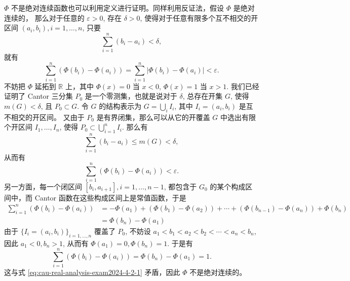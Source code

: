 \begin{solution}
\begin{enumerate}
    \(\Phi\) 不是绝对连续函数也可以利用定义进行证明。同样利用反证法，假设 \(\Phi\) 是绝对连续的， 那么对于任意的 \(\varepsilon > 0\), 存在 \(\delta > 0\), 使得对于任意有限多个互不相交的开区间 \((a_i, b_i), i = 1, \dots, n\), 只要
    \[\sum\limits_{i=1}^{n} (b_i - a_i) < \delta,\]
    就有
    \[\sum\limits_{i=1}^{n} (\Phi(b_i) - \Phi(a_i)) = \sum\limits_{i=1}^{n} \lvert \Phi(b_i) - \Phi(a_i) \rvert < \varepsilon.\]
    不妨把 \(\Phi\) 延拓到 \(\mathbb{R}\) 上，其中 \(\Phi(x) = 0\) 当 \(x < 0\), \(\Phi(x) = 1\) 当 \(x > 1\). 我们已经证明了 Cantor 三分集 \(P_0\) 是一个零测集，也就是说对于 \(\delta\), 总存在开集 \(G\), 使得 \(m(G) < \delta\), 且 \(P_0 \subset G\). 令 \(G\) 的结构表示为 \(G = \bigcup\limits_{i} I_i\), 其中 \(I_i = (a_i, b_i)\) 是互不相交的开区间。 又由于 \(P_0\) 是有界闭集，那么可以从它的开覆盖 \(G\) 中选出有限个开区间 \(I_1, \dots, I_n\), 使得 \(P_0 \subset \bigcup\limits_{i=1}^{n} I_i\). 那么有
    \[\sum\limits_{i=1}^{n} (b_i - a_i) \leqslant m(G) < \delta,\]
    从而有
    \begin{equation}
    \label{eq:cau-real-analysis-exam2024-4-2-1}
    \sum\limits_{i=1}^{n} (\Phi(b_i) - \Phi(a_i)) < \varepsilon.
    \end{equation}
    另一方面，每一个闭区间 \([b_i, a_{i+1}], i = 1, \dots, n-1\), 都包含于 \(G_0\) 的某个构成区间中，而 Cantor 函数在这些构成区间上是常值函数，于是
    \[\begin{aligned}
    \sum\limits_{i=1}^{n} (\Phi(b_i) - \Phi(a_i)) & = -\Phi(a_1) + (\Phi(b_1) - \Phi(a_2)) + \cdots + (\Phi(b_{n-1}) - \Phi(a_n)) + \Phi(b_n) \\
    & = \Phi(b_n) - \Phi(a_1)
    \end{aligned}\]
    由于 \(\{I_i = (a_i, b_i)\}_{i = 1, \dots, n}\) 覆盖了 \(P_0\), 不妨设 \(a_1 < b_1 < a_2 < b_2 < \cdots < a_n < b_n\), 因此 \(a_1 < 0, b_n > 1\), 从而有 \(\Phi(a_1) = 0, \Phi(b_n) = 1\). 于是有
    \[\sum\limits_{i=1}^{n} (\Phi(b_i) - \Phi(a_i)) = \Phi(b_n) - \Phi(a_1) = 1.\]
    这与式 \eqref{eq:cau-real-analysis-exam2024-4-2-1} 矛盾，因此 \(\Phi\) 不是绝对连续的。
  \end{enumerate}
\end{solution}



